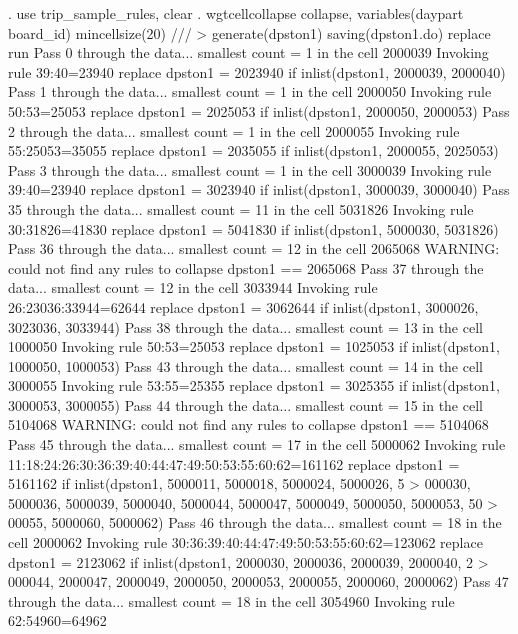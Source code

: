 . use trip_sample_rules, clear
{\smallskip}
. wgtcellcollapse collapse, variables(daypart board_id) mincellsize(20) ///
>         generate(dpston1) saving(dpston1.do) replace run
Pass 0 through the data...
  smallest count = 1 in the cell      2000039
  Invoking rule 39:40=23940
  replace dpston1 = 2023940 if inlist(dpston1, 2000039, 2000040)
Pass 1 through the data...
  smallest count = 1 in the cell      2000050
  Invoking rule 50:53=25053
  replace dpston1 = 2025053 if inlist(dpston1, 2000050, 2000053)
Pass 2 through the data...
  smallest count = 1 in the cell      2000055
  Invoking rule 55:25053=35055
  replace dpston1 = 2035055 if inlist(dpston1, 2000055, 2025053)
Pass 3 through the data...
  smallest count = 1 in the cell      3000039
  Invoking rule 39:40=23940
  replace dpston1 = 3023940 if inlist(dpston1, 3000039, 3000040)
\oom
Pass 35 through the data...
  smallest count = 11 in the cell      5031826
  Invoking rule 30:31826=41830
  replace dpston1 = 5041830 if inlist(dpston1, 5000030, 5031826)
Pass 36 through the data...
  smallest count = 12 in the cell      2065068
  WARNING: could not find any rules to collapse dpston1 == 2065068
Pass 37 through the data...
  smallest count = 12 in the cell      3033944
  Invoking rule 26:23036:33944=62644
  replace dpston1 = 3062644 if inlist(dpston1, 3000026, 3023036, 3033944)
\smallskip
\oom
\smallskip
Pass 38 through the data...
  smallest count = 13 in the cell      1000050
  Invoking rule 50:53=25053
  replace dpston1 = 1025053 if inlist(dpston1, 1000050, 1000053)
\smallskip
\oom
\smallskip
Pass 43 through the data...
  smallest count = 14 in the cell      3000055
  Invoking rule 53:55=25355
  replace dpston1 = 3025355 if inlist(dpston1, 3000053, 3000055)
Pass 44 through the data...
  smallest count = 15 in the cell      5104068
  WARNING: could not find any rules to collapse dpston1 == 5104068
Pass 45 through the data...
  smallest count = 17 in the cell      5000062
  Invoking rule 11:18:24:26:30:36:39:40:44:47:49:50:53:55:60:62=161162
  replace dpston1 = 5161162 if inlist(dpston1, 5000011, 5000018, 5000024, 5000026, 5
> 000030, 5000036, 5000039, 5000040, 5000044, 5000047, 5000049, 5000050, 5000053, 50
> 00055, 5000060, 5000062)
Pass 46 through the data...
  smallest count = 18 in the cell      2000062
  Invoking rule 30:36:39:40:44:47:49:50:53:55:60:62=123062
  replace dpston1 = 2123062 if inlist(dpston1, 2000030, 2000036, 2000039, 2000040, 2
> 000044, 2000047, 2000049, 2000050, 2000053, 2000055, 2000060, 2000062)
Pass 47 through the data...
  smallest count = 18 in the cell      3054960
  Invoking rule 62:54960=64962
